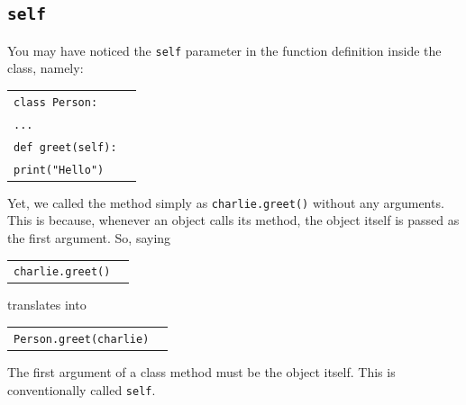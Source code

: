 \documentclass[t,handout,9pt]{beamer}
\begin{document}
\subsection{\texttt{self}}
\begin{frame}
\vfill
You may have noticed the \texttt{self} parameter in the function definition inside the class, namely:
\begin{table}[]
\begin{flushleft}
\begin{tabular}{ll}
\texttt{class Person:} &  \\
\texttt{\qquad ...} &  \\
\texttt{\qquad def greet(self):} &  \\
\texttt{\qquad\qquad print("Hello")} &  \\
\end{tabular}
\end{flushleft}
\end{table}
Yet, we called the method simply as \texttt{charlie.greet()} without any arguments.
\vfill
This is because, whenever an object calls its method, the object itself is passed as the first argument. So, saying
\begin{table}[]
\begin{flushleft}
\begin{tabular}{ll}
\texttt{charlie.greet()} &  \\
\end{tabular}
\end{flushleft}
\end{table}
translates into
\begin{table}[]
\begin{flushleft}
\begin{tabular}{ll}
\texttt{Person.greet(charlie)} &  \\
\end{tabular}
\end{flushleft}
\end{table}
\vfill
The first argument of a class method must be the object itself. This is conventionally called \texttt{self}.
\vfill
\end{frame}
%
\end{document}
